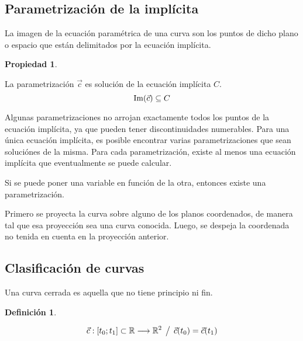 \documentclass[a5paper,12pt,twoside]{book}
\newtheorem{defn}{{Definición}}[chapter]
\newtheorem{prop}{{Propiedad}}[chapter]
\begin{document}
\subsection{Parametrización de la implícita}

La imagen de la ecuación paramétrica de una curva son los puntos de dicho plano o espacio que están delimitados por la ecuación implícita.

\begin{mdframed}[style=PropertyFrame]
    \begin{prop}
    \end{prop}
    La parametrización $\Vec{c}$ es solución de la ecuación implícita $C$.
    \begin{equation*}
        \operatorname{Im} (\Vec{c}) \subseteq C
    \end{equation*}
\end{mdframed}

Algunas parametrizaciones no arrojan exactamente todos los puntos de la ecuación implícita, ya que pueden tener discontinuidades numerables.
Para una única ecuación implícita, es posible encontrar varias parametrizaciones que sean soluciónes de la misma.
Para cada parametrización, existe al menos una ecuación implícita que eventualmente se puede calcular.


Si se puede poner una variable en función de la otra, entonces existe una parametrización.


Primero se proyecta la curva sobre alguno de los planos coordenados, de manera tal que esa proyección sea una curva conocida.
Luego, se despeja la coordenada no tenida en cuenta en la proyección anterior.


\subsection{Clasificación de curvas}

Una curva cerrada es aquella que no tiene principio ni fin.

\begin{mdframed}[style=DefinitionFrame]
    \begin{defn}
    \end{defn}
    \begin{equation*}
        \Vec{c}: [t_0;t_1] \subset \mathbb{R} \longrightarrow \mathbb{R}^2 \hspace{1ex} \big/ \hspace{1ex} \Vec{c}(t_0) = \Vec{c}(t_1)
    \end{equation*}
\end{mdframed}
\end{document}
